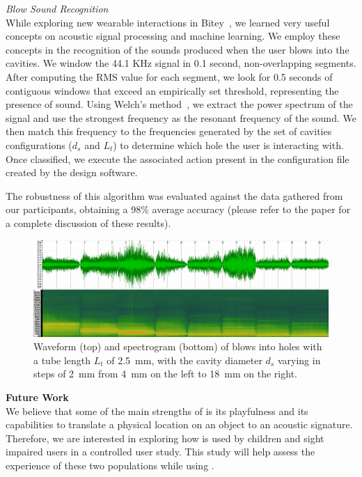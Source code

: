           \textit{Blow Sound Recognition}\\
            While exploring new wearable interactions in
            Bitey~\cite{Ashbrook:2016ek}, we learned very useful concepts on
            acoustic signal processing and machine learning. We employ these
            concepts in the recognition of the sounds produced when the user
            blows into the \bh cavities. We window the 44.1 KHz signal in 0.1
            second, non-overlapping segments. After computing the RMS value for
            each segment, we look for 0.5 seconds of contiguous windows that
            exceed an empirically set threshold, representing the presence of
            sound. Using Welch's method~\cite{Welch:1967jw}, we extract the
            power spectrum of the signal and use the strongest frequency as the
            resonant frequency of the sound. We then match this frequency to
            the frequencies generated by the set of cavities configurations
            ($d_s$ and $L_t$) to determine which hole the user is interacting
            with. Once classified, we execute the associated action present in
            the configuration file created by the design software.
                       
            The robustness of this algorithm was evaluated against the data
            gathered from our participants, obtaining a 98\% average accuracy
            (please refer to the paper for a complete discussion of these
            results).
            
        \begin{figure}[t]
          \centering
            \includegraphics[width=\textwidth]{figures/spectrogram.png}
            \caption{Waveform (top) and spectrogram (bottom) of blows into
            holes with a tube length $L_t$ of 2.5~mm, with the cavity diameter
            $d_s$ varying in steps of 2~mm from 4~mm on the left to 18~mm on
            the right.}
            \label{fig:spectrogram}
        \end{figure}

      \textbf{Future Work}\\        
        We believe that some of the main strengths of \bh is its
        playfulness and its capabilities to translate a physical location on an object to an
        acoustic signature. Therefore, we are interested in exploring how
        \bh is used by children and sight impaired users in a controlled
        user study. This study will help assess the experience of these two
        populations while using \bh.
        
